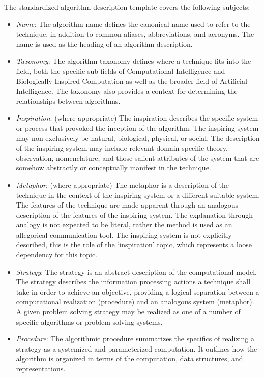 \begin{bibunit}
The standardized algorithm description template covers the following subjects:
\begin{itemize}
	\item \emph{Name}: The algorithm name defines the canonical name used to refer to the technique, in addition to common aliases, abbreviations, and acronyms. The name is used as the heading of an algorithm description.
	\item \emph{Taxonomy}: The algorithm taxonomy defines where a technique fits into the field, both the specific sub-fields of Computational Intelligence and Biologically Inspired Computation as well as the broader field of Artificial Intelligence. The taxonomy also provides a context for determining the relationships between algorithms.
	\item \emph{Inspiration}: (where appropriate) The inspiration describes the specific system or process that provoked the inception of the algorithm. The inspiring system may non-exclusively be natural, biological, physical, or social. The description of the inspiring system may include relevant domain specific theory, observation, nomenclature, and those salient attributes of the system that are somehow abstractly or conceptually manifest in the technique.
	\item \emph{Metaphor}: (where appropriate) The metaphor is a description of the technique in the context of the inspiring system or a different suitable system. The features of the technique are made apparent through an analogous description of the features of the inspiring system. The explanation through analogy is not expected to be literal, rather the method is used as an allegorical communication tool. The inspiring system is not explicitly described, this is the role of the `inspiration' topic, which represents a loose dependency for this topic.
	\item \emph{Strategy}: The strategy is an abstract description of the computational model. The strategy describes the information processing actions a technique shall take in order to achieve an objective, providing a logical separation between a computational realization (procedure) and an analogous system (metaphor). A given problem solving strategy may be realized as one of a number of specific algorithms or problem solving systems.
	\item \emph{Procedure}: The algorithmic procedure summarizes the specifics of realizing a strategy as a systemized and parameterized computation. It outlines how the algorithm is organized in terms of the computation, data structures, and representations. 

\end{itemize}
\end{bibunit}

